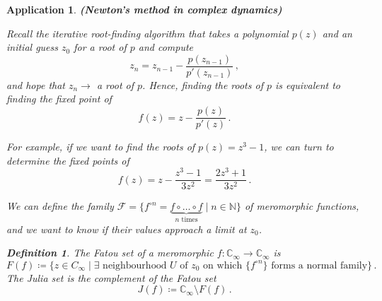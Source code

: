 \documentclass{article}
\theoremstyle{plain}\theoremheaderfont{\normalfont\itshape}\theorembodyfont{\rmfamily}\theoremseparator{.}\newtheorem*{rem}{Remark}\newtheorem*{ex}{Example}\newtheorem*{proof}{Proof}\newtheorem*{altp}{Alternative proof}\newtheorem*{con}{Consequences}\newtheorem*{notn}{Notations}\newtheorem*{cau}{Caution}\newtheorem*{term}{Terminology}\newtheorem*{keyex}{Key example}
\theoremstyle{plain}\theoremheaderfont{\normalfont\bfseries}\theorembodyfont{\rmfamily}\theoremseparator{.}\newtheorem{thm}{Theorem}[section]\newtheorem{lem}[thm]{Lemma}\newtheorem{prop}[thm]{Proposition}\newtheorem*{cor}{Corollary}\newtheorem{defn}[thm]{Definition}\newtheorem{clm}[thm]{Claim}\newtheorem{clminproof}{Claim}\newtheorem{leminproof}{Lemma}\newtheorem{app}{Application}
\theoremstyle{break}\theoremheaderfont{\normalfont\itshape}\theorembodyfont{\rmfamily}\theoremseparator{.\medskip}\newtheorem*{proofskip}{Proof}\newtheorem*{exs}{Examples}\newtheorem*{rems}{Remarks}\newtheorem*{rec}{Recall}\newtheorem*{ppts}{Properties}
\theoremstyle{break}\theoremheaderfont{\normalfont\bfseries}\theorembodyfont{\rmfamily}\theoremseparator{.\medskip}\newtheorem{lemskip}[thm]{Lemma}\newtheorem{defnskip}[thm]{Definition}\newtheorem{propskip}[thm]{Proposition}\newtheorem{thmskip}[thm]{Theorem}
\numberwithin{equation}{section}
\newcommand{\NN}{\mathbb{N}}
\newcommand{\CC}{\mathbb{C}}
\begin{document}
    \begin{app}
        \textbf{(Newton's method in complex dynamics)}

        Recall the iterative root-finding algorithm that takes a polynomial \(p(z)\) and an initial guess \(z_0\) for a root of \(p\) and compute
        \[z_n=z_{n-1}-\frac{p(z_{n-1})}{p'(z_{n-1})}\,,\]
        and hope that \(z_n\to\) a root of \(p\). Hence, finding the roots of \(p\) is equivalent to finding the fixed point of
        \[f(z)=z-\frac{p(z)}{p'(z)}\,.\]

        For example, if we want to find the roots of \(p(z)=z^3-1\), we can turn to determine the fixed points of 
        \[f(z)=z-\frac{z^3-1}{3z^2}=\frac{2z^3+1}{3z^2}\,.\]
        \begin{figure}[ht!]
            \centering
        \end{figure}

        We can define the family \(\mathcal{F}=\{f^{\circ n}=\underbrace{f\circ\dots\circ f}_{n\text{ times}}\mid n\in\NN\}\) of meromorphic functions, and we want to know if their values approach a limit at \(z_0\).

        \begin{defn}
            The \textit{Fatou set} of a meromorphic \(f:\CC_\infty\to\CC_{\infty}\) is
            \[F(f)\coloneqq\{z\in C_\infty\mid\exists\text{ neighbourhood }U\text{ of }z_0\text{ on which }\{f^{\circ n}\}\text{ forms a normal family}\}\,.\]
            The \textit{Julia set} is the complement of the Fatou set
            \[J(f)\coloneqq\CC_\infty\setminus F(f)\,.\]
        \end{defn}


\end{app}
\end{document}
